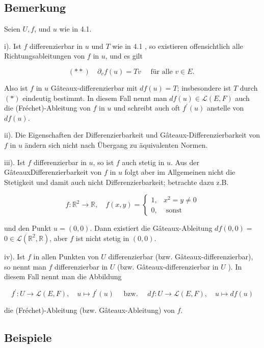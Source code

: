 \documentclass[10pt, letterpaper]{article}
\begin{document}
\subsection*{Bemerkung}

Seien $U, f$, und $u$ wie in 4.1.

i). Ist $f$ differenzierbar in $u$ und $T$ wie in 4.1 , so existieren offensichtlich alle Richtungsableitungen von $f$ in $u$, und es gilt

$$
(* *) \quad \partial_{v} f(u)=T v \quad \text { für alle } v \in E \text {. }
$$

Also ist $f$ in $u$ Gâteaux-differenzierbar mit $d f(u)=T$; insbesondere ist $T$ durch $(*)$ eindeutig bestimmt. In diesem Fall nennt man $d f(u) \in \mathcal{L}(E, F)$ auch die (Fréchet)-Ableitung von $f$ in $u$ und schreibt auch oft $f^{\prime}(u)$ anstelle von $d f(u)$.

ii). Die Eigenschaften der Differenzierbarkeit und Gâteaux-Differenzierbarkeit von $f$ in $u$ ändern sich nicht nach Übergang zu äquivalenten Normen.

iii). Ist $f$ differenzierbar in $u$, so ist $f$ auch stetig in $u$. Aus der GâteauxDifferenzierbarkeit von $f$ in $u$ folgt aber im Allgemeinen nicht die Stetigkeit und damit auch nicht Differenzierbarkeit; betrachte dazu z.B.

$$
f: \mathbb{R}^{2} \rightarrow \mathbb{R}, \quad f(x, y)= \begin{cases}1, & x^{2}=y \neq 0 \\ 0, & \text { sonst }\end{cases}
$$

und den Punkt $u=(0,0)$. Dann existiert die Gâteaux-Ableitung $d f(0,0)=$ $0 \in \mathcal{L}\left(\mathbb{R}^{2}, \mathbb{R}\right)$, aber $f$ ist nicht stetig in $(0,0)$.

iv). Ist $f$ in allen Punkten von $U$ differenzierbar (bzw. Gâteaux-differenzierbar), so nennt man $f$ differenzierbar in $U$ (bzw. Gâteaux-differenzierbar in $U$ ). In diesem Fall nennt man die Abbildung

$$
f^{\prime}: U \rightarrow \mathcal{L}(E, F), \quad u \mapsto f^{\prime}(u) \quad \text { bzw. } \quad d f: U \rightarrow \mathcal{L}(E, F), \quad u \mapsto d f(u)
$$

die (Fréchet)-Ableitung (bzw. Gâteaux-Ableitung) von $f$.

\subsection*{Beispiele}
\end{document}
